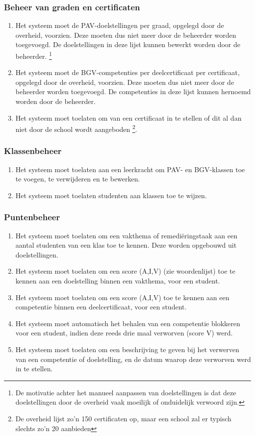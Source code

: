 \documentclass[a4paper]{article}
\begin{document}
\subsubsection{Beheer van graden en certificaten}
\begin{enumerate}[label=F\arabic*,resume]
\item Het systeem moet de PAV-doelstellingen per graad, opgelegd door de overheid, voorzien. Deze moeten dus niet meer door de beheerder worden toegevoegd. De doelstellingen in deze lijst kunnen bewerkt worden door de beheerder. \footnote{De motivatie achter het manueel aanpassen van doelstellingen is dat deze doelstellingen door de overheid vaak moeilijk of onduidelijk verwoord zijn.}
\item Het systeem moet de BGV-competenties per deelcertificaat per certificaat, opgelegd door de overheid, voorzien. Deze moeten dus niet meer door de beheerder worden toegevoegd. De competenties in deze lijst kunnen hernoemd worden door de beheerder.
\item Het systeem moet toelaten om van een certificaat in te stellen of dit al dan niet door de school wordt aangeboden \footnote{De overheid lijst zo'n 150 certificaten op, maar een school zal er typisch slechts zo'n 20 aanbieden}.
\end{enumerate}

\subsubsection{Klassenbeheer}
\begin{enumerate}[label=F\arabic*,resume]
\item Het systeem moet toelaten aan een leerkracht om PAV- en BGV-klassen toe te voegen, te verwijderen en te bewerken.
\item Het systeem moet toelaten studenten aan klassen toe te wijzen.
\end{enumerate}

\subsubsection{Puntenbeheer}
\begin{enumerate}[label=F\arabic*,resume]
\item Het systeem moet toelaten om een vakthema of remediëringstaak aan een aantal studenten van een klas toe te kennen. Deze worden opgebouwd uit doelstellingen. 
\item Het systeem moet toelaten om een score (A,I,V) (zie woordenlijst) toe te kennen aan een doelstelling binnen een vakthema, voor een student.
\item Het systeem moet toelaten om een score (A,I,V) toe te kennen aan een competentie binnen een deelcertificaat, voor een student.
\item Het systeem moet automatisch het behalen van een competentie blokkeren voor een student, indien deze reeds drie maal verworven (score V) werd.  %
\item Het systeem moet toelaten om een beschrijving te geven bij het verwerven van een competentie of doelstelling, en de datum waarop deze verworven werd in te stellen.
\end{enumerate}
\end{document}
